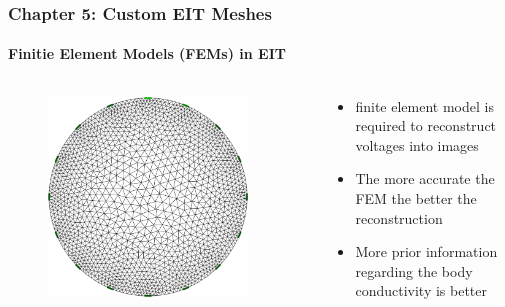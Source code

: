 \documentclass[10pt,    %
    english,            %
    xcolor=table,       %
    envcountsect,        %
    aspectratio=1610
]{beamer}
\begin{document}
\begin{frame}
	\frametitle{Chapter 5: Custom EIT Meshes}
	\framesubtitle{Finitie Element Models (FEMs) in EIT}    
	\begin{columns}[c]
		\begin{column}{0.5\textwidth}
			\begin{figure}[H]
				\centering
				\includegraphics[width=0.9\textwidth]{basic_mesh.png}
			\end{figure}
		\end{column}
		\begin{column}{0.5\textwidth}
			\begin{itemize}
				\item \alert{finite element model is required to reconstruct voltages into images}
				\item The more accurate the FEM the better the reconstruction  
				\item More prior information regarding the body conductivity is better
			\end{itemize}
		\end{column}
	\end{columns}
\end{frame}
\end{document}
